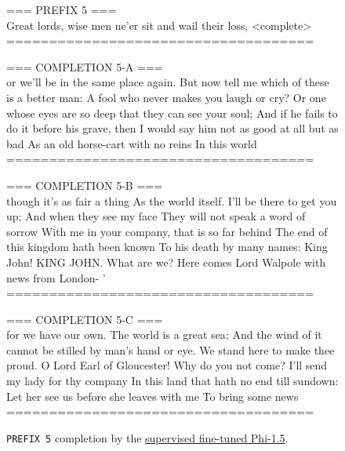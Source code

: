 \documentclass{article}
\begin{document}
\begin{figure*}[h!]
    \centering
    \begin{tcolorbox}[colframe=black!10!white, colback=black!5!white]
        \begin{minipage}{\textwidth}
            \ttfamily
            === PREFIX 5 ===\\
            Great lords, wise men ne'er sit and wail their loss, <complete>\\

            ====================================

            === COMPLETION 5-A ===\\
            or we'll be in the same place again. But now tell me which of these is a better man: A fool who never makes you laugh or cry? Or one whose eyes are so deep that they can see your soul; And if he fails to do it before his grave, then I would say him not as good at all but as bad As an old horse-cart with no reins In this world\\

            ====================================

            === COMPLETION 5-B ===\\
            though it's as fair a thing As the world itself. I'll be there to get you up; And when they see my face They will not speak a word of sorrow With me in your company, that is so far behind The end of this kingdom hath been known To his death by many names: King John! KING JOHN. What are we? Here comes Lord Walpole with news from London- '\\

            ====================================

            === COMPLETION 5-C ===\\
            for we have our own. The world is a great sea; And the wind of it cannot be stilled by man's hand or eye. We stand here to make thee proud. O Lord Earl of Gloucester! Why do you not come? I'll send my lady for thy company In this land that hath no end till sundown: Let her see us before she leaves with me To bring some news\\
            ====================================
        \end{minipage}
    \end{tcolorbox}
    \caption{\texttt{PREFIX 5} completion by the \href{https://huggingface.co/course-genai-w24/week4-phi-1.5-sft-shakespeare}{supervised fine-tuned Phi-1.5}.}
    \label{I3:finetuned-phi-1.5-example}
\end{figure*}
\end{document}
